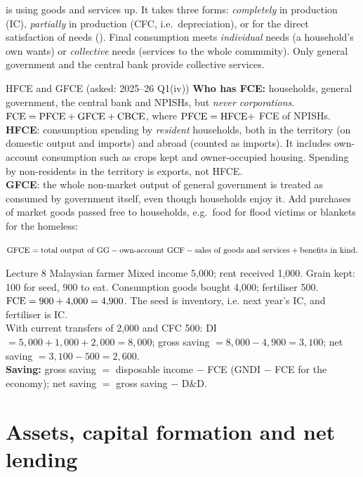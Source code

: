  is using goods and services up. It takes three forms: \emph{completely} in
production (IC), \emph{partially} in production (CFC, i.e.\ depreciation), or for the direct
satisfaction of needs (). Final consumption meets \emph{individual} needs
(a household's own wants) or \emph{collective} needs (services to the whole community). Only
general government and the central bank provide collective services.

\begin{keybox}{HFCE and GFCE (asked: 2025--26 Q1(iv))}
\small
\textbf{Who has FCE:} households, general government, the central bank and NPISHs, but
\emph{never corporations}. $\mathrm{FCE}=\mathrm{PFCE}+\mathrm{GFCE}+\mathrm{CBCE}$, where $\mathrm{PFCE}=\mathrm{HFCE}+$ FCE of
NPISHs.\\[2pt]
\textbf{HFCE}: consumption spending by \emph{resident} households, both in the territory (on
domestic output and imports) and abroad (counted as imports). It includes own-account consumption
such as crops kept and owner-occupied housing. Spending by non-residents in the territory is
exports, not HFCE.\\[2pt]
\textbf{GFCE}: the whole non-market output of general government is treated as consumed by
government itself, even though households enjoy it. Add purchases of market goods passed free to
households, e.g.\ food for flood victims or blankets for the homeless:\\[1pt]
\centerline{$\mathrm{GFCE}=\text{total output of GG}-\text{own-account GCF}-\text{sales of goods and services}
+\text{benefits in kind}.$}
\end{keybox}

\begin{tmpl}{Lecture 8 Malaysian farmer}
\small Mixed income 5,000; rent received 1,000. Grain kept: 100 for seed, 900 to eat. Consumption
goods bought 4,000; fertiliser 500. $\mathrm{FCE}=900+4{,}000=4{,}900$. The seed is inventory, i.e.
next year's IC, and fertiliser is IC.\\
With current transfers of 2,000 and CFC 500: DI $=5{,}000+1{,}000+2{,}000=8{,}000$; gross saving
$=8{,}000-4{,}900=3{,}100$; net saving $=3{,}100-500=2{,}600$.\\
\textbf{Saving:} gross saving $=$ disposable income $-$ FCE (GNDI $-$ FCE for the economy);
net saving $=$ gross saving $-$ D\&D.
\end{tmpl}

\section{Assets, capital formation and net lending}\label{sec:assets}

